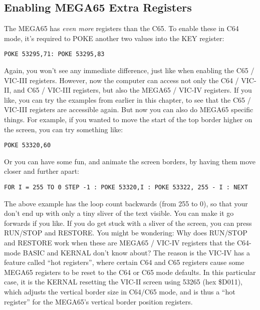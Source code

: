 \subsection{Enabling MEGA65 Extra Registers}

The MEGA65 has \textit{even more} registers than the C65.  To enable these in C64 mode, it's required to POKE another
two values into the KEY register:

\begin{tcolorbox}[colback=black,coltext=white]
\verbatimfont{\codefont}
\begin{verbatim}
POKE 53295,71: POKE 53295,83
\end{verbatim}
\end{tcolorbox}

Again, you won't see any immediate difference, just like when enabling the C65 / VIC-III registers.  However, now the computer
can access not only the C64 / VIC-II, and C65 / VIC-III registers, but also the MEGA65 / VIC-IV registers.  If you like,
you can try the examples from earlier in this chapter, to see that the C65 / VIC-III registers are accessible again.
But now you can also do MEGA65 specific things. For example, if you wanted to move the start of the top border higher
on the screen, you can try something like:

\begin{tcolorbox}[colback=black,coltext=white]
\verbatimfont{\codefont}
\begin{verbatim}
POKE 53320,60
\end{verbatim}
\end{tcolorbox}

Or you can have some fun, and animate the screen borders, by having them move closer and further apart:

\begin{tcolorbox}[colback=black,coltext=white]
\verbatimfont{\codefont}
\begin{verbatim}
FOR I = 255 TO 0 STEP -1 : POKE 53320,I : POKE 53322, 255 - I : NEXT
\end{verbatim}
\end{tcolorbox}

The above example has the loop count backwards (from 255 to 0), so that your don't end up with only a
tiny sliver of the text visible. You can make it go forwards if you like. If you do get stuck with a sliver
of the screen, you can press RUN/STOP and RESTORE. You might be wondering: Why does RUN/STOP
and RESTORE work when these are MEGA65 / VIC-IV registers that the C64-mode BASIC and KERNAL
don't know about?  The reason is the VIC-IV has a feature called ``hot registers'',
where certain C64 and C65 registers cause some MEGA65 registers to be reset to the C64 or
C65 mode defaults. In this particular case, it is the KERNAL resetting the VIC-II screen using
53265 (hex \$D011), which adjusts the vertical border size in C64/C65 mode, and is thus a ``hot register''
for the MEGA65's vertical border position registers.

